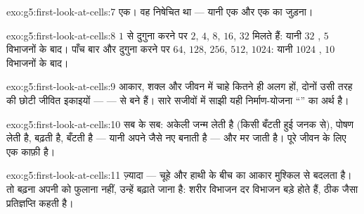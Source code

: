 \begin{solution}{exo:g5:first-look-at-cells:7}
एक। वह निषेचित  था --- यानी एक  और एक  का जुड़ना।
\end{solution}

\begin{solution}{exo:g5:first-look-at-cells:8}
$1$ से दुगुना करने पर $2$, $4$, $8$, $16$, $32$ मिलते हैं: यानी $32$
, $5$ विभाजनों के बाद। पाँच बार और दुगुना करने पर $64$, $128$,
$256$, $512$, $1024$: यानी $1024$ , $10$ विभाजनों के बाद।
\end{solution}

\begin{solution}{exo:g5:first-look-at-cells:9}
आकार, शक्ल और जीवन में चाहे कितने ही अलग हों, दोनों उसी तरह की छोटी
जीवित इकाइयों ---  --- से बने हैं। सारे सजीवों में साझी यही
निर्माण-योजना ``'' का अर्थ है।
\end{solution}

\begin{solution}{exo:g5:first-look-at-cells:10}
सब के सब: अकेली  जन्म लेती है (किसी बँटती हुई जनक  से),
पोषण लेती है, बढ़ती है, बँटती है --- यानी अपने जैसे नए  बनाती है
--- और मर जाती है। पूरे जीवन के लिए एक  काफ़ी है।
\end{solution}

\begin{solution}{exo:g5:first-look-at-cells:11}
ज़्यादा  --- चूहे और हाथी के बीच  का आकार मुश्किल से
बदलता है। तो बढ़ना अपनी  को फुलाना नहीं, उन्हें बढ़ाते जाना है:
शरीर विभाजन दर विभाजन बड़े होते हैं, ठीक जैसा प्रतिज्ञप्ति कहती है।
\end{solution}
